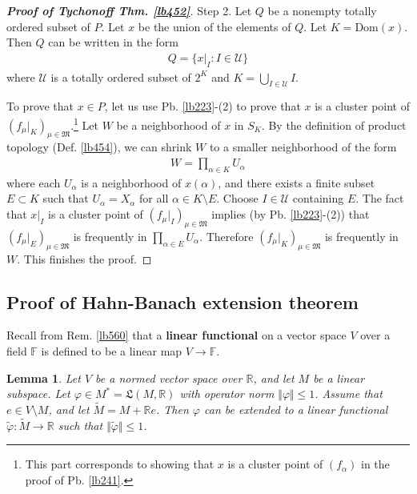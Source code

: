 \documentclass[12pt,b5paper,notitlepage]{article}
\theoremstyle{definition}
\theoremstyle{plain}
\newtheorem{lm}[df]{Lemma}
\newcommand{\fk}{\mathfrak}
\newcommand{\wtd}{\widetilde}
\newcommand{\Dom}{\mathrm{Dom}}
\newcommand{\scr}{\mathscr}
\newcommand{\Rbb}{\mathbb R}
\newcommand{\Fbb}{\mathbb F}
\numberwithin{equation}{section}
\begin{document}
\begin{proof}[\textbf{Proof of Tychonoff Thm. \ref{lb452}}]
Step 2. Let $Q$ be a nonempty totally ordered subset of $P$. Let $x$ be the union of the elements of $Q$. Let $K=\Dom(x)$. Then $Q$ can be written in the form
\begin{align*}
Q=\{x|_I:I\in\scr U\}
\end{align*}
where $\scr U$ is a totally ordered subset of $2^K$ and $K=\bigcup_{I\in\scr U}I$.



To prove that $x\in P$,  let us use Pb. \ref{lb223}-(2) to prove that $x$ is a cluster point of $(f_\mu|_K)_{\mu\in\fk M}$.\footnote{This part corresponds to showing that $x$ is a cluster point of $(f_\alpha)$ in the proof of Pb. \ref{lb241}.} Let $W$ be a neighborhood of $x$ in $S_K$. By the definition of product topology (Def. \ref{lb454}), we can shrink $W$ to a smaller neighborhood of the form
\begin{align*}
W=\prod_{\alpha\in K}U_\alpha
\end{align*}
where each $U_\alpha$ is a neighborhood of $x(\alpha)$, and there exists a finite subset $E\subset K$ such that $U_\alpha=X_\alpha$ for all $\alpha\in K\setminus E$. Choose $I\in\scr U$ containing $E$. The fact that $x|_I$ is a cluster point of $(f_\mu|_I)_{\mu\in\fk M}$ implies (by Pb. \ref{lb223}-(2)) that $(f_\mu|_E)_{\mu\in\fk M}$ is frequently in $\prod_{\alpha\in E}U_\alpha$. Therefore $(f_\mu|_K)_{\mu\in\fk M}$ is frequently in $W$. This finishes the proof.
\end{proof}



\subsection{Proof of Hahn-Banach extension theorem}

Recall from Rem. \ref{lb560} that a \textbf{linear functional} on a vector space $V$ over a field $\Fbb$ is defined to be a linear map $V\rightarrow\Fbb$.

\begin{lm}\label{lb498}
Let $V$ be a normed vector space over $\Rbb$, and let $M$ be a linear subspace. Let $\varphi\in M^*=\fk L(M,\Rbb)$ with operator norm $\Vert\varphi\Vert\leq 1$. Assume that $e\in V\setminus M$, and let $\wtd M=M+\Rbb e$. Then $\varphi$ can be extended to a linear functional $\wtd\varphi:\wtd M\rightarrow\Rbb$ such that $\Vert\wtd \varphi\Vert\leq 1$. 
\end{lm}
\end{document}
